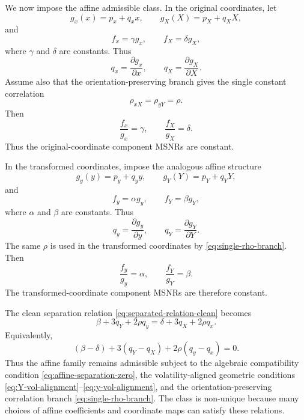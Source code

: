 \documentclass[11pt]{article}
\numberwithin{equation}{section}
\begin{document}
We now impose the affine admissible class. In the original coordinates, let
\begin{equation}
\label{eq:old-affine-g}
g_x(x)=p_x+q_xx,
\qquad
g_X(X)=p_X+q_XX,
\end{equation}
and
\begin{equation}
\label{eq:old-affine-f}
f_x=\gamma g_x,
\qquad
f_X=\delta g_X,
\end{equation}
where \(\gamma\) and \(\delta\) are constants. Thus
\[
q_x=\frac{\partial g_x}{\partial x},
\qquad
q_X=\frac{\partial g_X}{\partial X}.
\] Assume also that the orientation-preserving branch gives the single constant correlation
\[
\rho_{xX}=\rho_{yY}=\rho.
\]
Then
\[
\frac{f_x}{g_x}=\gamma,
\qquad
\frac{f_X}{g_X}=\delta.
\]
Thus the original-coordinate component MSNRs are constant.

In the transformed coordinates, impose the analogous affine structure
\begin{equation}
\label{eq:new-affine-g}
g_y(y)=p_y+q_yy,
\qquad
g_Y(Y)=p_Y+q_YY,
\end{equation}
and
\begin{equation}
\label{eq:new-affine-f}
f_y=\alpha g_y,
\qquad
f_Y=\beta g_Y,
\end{equation}
where \(\alpha\) and \(\beta\) are constants. Thus
\[
q_y=\frac{\partial g_y}{\partial y},
\qquad
q_Y=\frac{\partial g_Y}{\partial Y}.
\] The same \(\rho\) is used in the transformed coordinates by \eqref{eq:single-rho-branch}.
Then
\begin{equation}
\label{eq:component-MSNRs}
\frac{f_y}{g_y}=\alpha,
\qquad
\frac{f_Y}{g_Y}=\beta.
\end{equation}
The transformed-coordinate component MSNRs are therefore constant.

The clean separation relation \eqref{eq:separated-relation-clean} becomes
\begin{equation}
\label{eq:affine-separation}
\beta+3q_Y+2\rho q_y
=
\delta+3q_X+2\rho q_x.
\end{equation}
Equivalently,
\begin{equation}
\label{eq:affine-separation-zero}
(\beta-\delta)+3(q_Y-q_X)+2\rho(q_y-q_x)=0.
\end{equation}
Thus the affine family remains admissible subject to the algebraic compatibility condition \eqref{eq:affine-separation-zero}, the volatility-aligned geometric conditions \eqref{eq:Y-vol-alignment}--\eqref{eq:y-vol-alignment}, and the orientation-preserving correlation branch \eqref{eq:single-rho-branch}. The class is non-unique because many choices of affine coefficients and coordinate maps can satisfy these relations.
\end{document}
